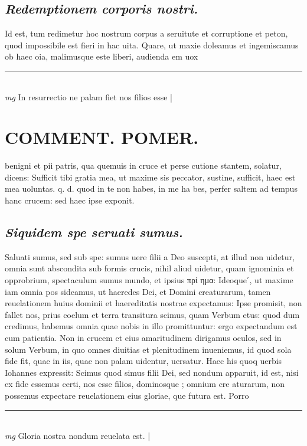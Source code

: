 \documentclass{article}
\begin{document}
\begin{pages}
\subsection*{\textit{Redemptionem corporis nostri. }}\pstart Id est, tum redimetur hoc nostrum corpus a seruitute et corruptione et peton, quod impossibile est fieri in hac uita. Quare, ut maxie doleamus et ingemiscamus ob haec oia, malimusque este liberi, audienda em uox  \pend
\vspace{0.5cm}\noindent
\vspace{0.2cm}\rule{1cm}{0.2pt}\\ 
\hspace{0.2cm}\textit{mg}
\footnotesize In resurrectio ne palam fiet nos filios esse 
\normalsize| 
\section*{COMMENT. POMER.  }\pstart benigni et pii patris, qua quemuis in cruce et perse cutione stantem, solatur, dicens: Sufficit tibi gratia mea, ut maxime sis peccator, sustine, sufficit, haec est mea uoluntas. q. d. quod in te non habes, in me ha bes, perfer saltem ad tempus hanc crucem: sed haec ipse exponit.  \pend
{}
{}
\subsection*{\textit{Siquidem spe seruati sumus. }}\pstart Saluati sumus, sed sub spe: sumus uere filii a Deo suscepti, at illud non uidetur, omnia sunt abscondita sub formis crucis, nihil aliud uidetur, quam ignominia et opprobrium, spectaculum sumus mundo, et ipsius πρί ημα: Ideoque ́, ut maxime iam omnia pos sideamus, ut haeredes Dei, et Domini creaturarum, tamen reuelationem huius dominii et haereditatis nostrae expectamus: Ipse promisit, non fallet nos, prius coelum et terra transitura scimus, quam Verbum etus: quod dum credimus, habemus omnia quae nobis in illo promittuntur: ergo expectandum est cum patientia. Non in crucem et eius amaritudinem dirigamus oculos, sed in solum Verbum, in quo omnes diuitias et plenitudinem inueniemus, id quod sola fide fit, quae in iis, quae non palam uidentur, uersatur. Haec his quoq uerbis Iohannes expressit: Scimus quod simus filii Dei, sed nondum apparuit, id est, nisi ex fide essemus certi, nos esse filios, dominosque ; omnium cre aturarum, non possemus expectare reuelationem eius gloriae, que futura est.  Porro  \pend
\vspace{0.5cm}\noindent
\vspace{0.2cm}\rule{1cm}{0.2pt}\\ 
\hspace{0.2cm}\textit{mg}
\footnotesize Gloria nostra nondum reuelata est.  
\normalsize| 

\end{pages}
\end{document}

